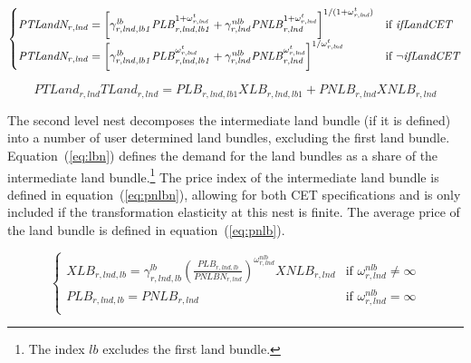 \documentclass[11pt,letterpaper]{report}
\begin{document}
\begin{equation}
\label{eq:ptlandn}
\begin{cases}
\mathit{PTLandN_{r,\mathit{lnd}}} =
   \left[
      \gamma^{\mathit{lb}}_{r,\mathit{lnd},\mathit{lb1}}
      \mathit{PLB}_{r,\mathit{lnd},\mathit{lb1}}^{1+\omega^t_{r,\mathit{lnd}}}
   +  \gamma^{\mathit{nlb}}_{r,\mathit{lnd}}
      \mathit{PNLB}_{r,\mathit{lnd}}^{1+\omega^t_{r,\mathit{lnd}}}
   \right]^{{1}/{(1+\omega^t_{r,\mathit{lnd}})}}
& \textnormal{if } \mathit{ifLandCET} \\
\mathit{PTLandN_{r,\mathit{lnd}}} =
   \left[
      \gamma^{\mathit{lb}}_{r,\mathit{lnd},\mathit{lb1}}
      \mathit{PLB}_{r,\mathit{lnd},\mathit{lb1}}^{\omega^t_{r,\mathit{lnd}}}
   +  \gamma^{\mathit{nlb}}_{r,\mathit{lnd}}
      \mathit{PNLB}_{r,\mathit{lnd}}^{\omega^t_{r,\mathit{lnd}}}
   \right]^{{1}/{\omega^t_{r,\mathit{lnd}}}}
& \textnormal{if } \neg \mathit{ifLandCET} \\
\end{cases}
\end{equation}

\begin{equation}
\label{eq:ptland}
\mathit{PTLand_{r,\mathit{lnd}}} \mathit{TLand_{r,\mathit{lnd}}} =
   \mathit{PLB}_{r,\mathit{lnd},\mathit{lb1}} \mathit{XLB}_{r,\mathit{lnd},\mathit{lb1}}
+  \mathit{PNLB}_{r,\mathit{lnd}}\mathit{XNLB}_{r,\mathit{lnd}}
\end{equation}

The second level nest decomposes the intermediate land bundle (if it is defined)
into a number of user determined land bundles, excluding the first land bundle.
Equation~(\ref{eq:lbn}) defines the demand for the land bundles as a share of
the intermediate land bundle.\footnote{The index $\mathit{lb}$ excludes the
first land bundle.} The price index of the intermediate land bundle is defined
in equation~(\ref{eq:pnlbn}), allowing for both CET specifications and is only
included if the transformation elasticity at this nest is finite. The average
price of the land bundle is defined in equation~(\ref{eq:pnlb}).

\begin{equation}
\label{eq:lbn}
\begin{cases}
   \displaystyle \mathit{XLB}_{r,\mathit{lnd},\mathit{lb}} =
      \gamma^{\mathit{lb}}_{r,\mathit{lnd},\mathit{lb}}
      \left( \frac{\mathit{PLB}_{r,\mathit{lnd},\mathit{lb}}} {\mathit{PNLBN_{r,\mathit{lnd}}}}
      \right)^{\omega^{\mathit{nlb}}_{r,\mathit{lnd}}}
      \mathit{XNLB_{r,\mathit{lnd}}}
   & \textrm{if } \omega^{\mathit{nlb}}_{r,\mathit{lnd}} \ne \infty \\
   \displaystyle \mathit{PLB}_{r,\mathit{lnd},\mathit{lb}} = \mathit{PNLB_{r,\mathit{lnd}}}
   & \textrm{if }  \omega^{\mathit{nlb}}_{r,\mathit{lnd}} = \infty \\
\end{cases}
\end{equation}
\end{document}
